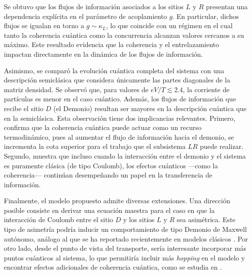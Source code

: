 Se obtuvo que los flujos de información asociados a los sitios $L$ y $R$ presentan una dependencia explícita en el parámetro de acoplamiento $g$. En particular, dichos flujos se igualan en torno a $g \sim \kappa_L$, lo que coincide con un régimen en el cual tanto la coherencia cuántica como la concurrencia alcanzan valores cercanos a su máximo. Este resultado evidencia que la coherencia y el entrelazamiento impactan directamente en la dinámica de los flujos de información.

Asimismo, se comparó la evolución cuántica completa del sistema con una descripción semiclásica que considera únicamente las partes diagonales de la matriz densidad. Se observó que, para valores de $eV/T \lesssim 2.4$, la corriente de partículas es menor en el caso cuántico. Además, los flujos de información que recibe el sitio $D$ (el Demonio) resultan ser mayores en la descripción cuántica que en la semiclásica. Esta observación tiene dos implicancias relevantes. Primero, confirma que la coherencia cuántica puede actuar como un recurso termodinámico, pues al aumentar el flujo de información hacia el demonio, se incrementa la cota superior para el trabajo que el subsistema $LR$ puede realizar. Segundo, muestra que incluso cuando la interacción entre el demonio y el sistema es puramente clásica (de tipo Coulomb), los efectos cuánticos —como la coherencia— continúan desempeñando un papel en la transferencia de información.

Finalmente, el modelo propuesto admite diversas extensiones. Una dirección posible consiste en derivar una ecuación maestra para el caso en que la interacción de Coulomb entre el sitio \( D \) y los sitios \( L \) y \( R \) sea asimétrica. Este tipo de asimetría podría inducir un comportamiento de tipo Demonio de Maxwell autónomo, análogo al que se ha reportado recientemente en modelos clásicos \cite{monsel2025autonomous}. Por otro lado, desde el punto de vista del transporte, sería interesante incorporar más puntos cuánticos al sistema, lo que permitiría incluir más \textit{hopping} en el modelo y encontrar efectos adicionales de coherencia cuántica, como se estudia en \cite{khandelwal2025maximal}.





